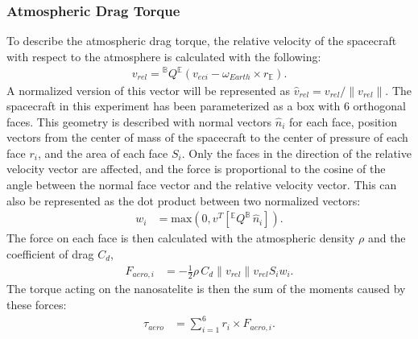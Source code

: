 \subsubsection{Atmospheric Drag Torque}
To describe the atmospheric drag torque, the relative velocity of the spacecraft with respect to the atmosphere is calculated with the following:
\begin{align}
    v_{rel} = {}^{\mathbb{B}} Q {}^{\mathbb{E}} ( v_{eci} - \omega_{Earth} \times r_{\mathbb{E}} ).
\end{align}
A normalized version of this vector will be represented as $\hat{v}_{rel} = v_{rel}/\|v_{rel}\|$.
The spacecraft in this experiment has been parameterized as a box with 6 orthogonal faces. This geometry is described with normal vectors $\hat{n}_i$ for each face, position vectors from the center of mass of the spacecraft to the center of pressure of each face $r_i$, and the area of each face $S_i$. Only the faces in the direction of the relative velocity vector are affected, and the force is proportional to the cosine of the angle between the normal face vector and the relative velocity vector. This can also be represented as the dot product between two normalized vectors:
\begin{align}
w_i &= \text{max}(0,v^T [^{\mathbb{E}}Q^{\mathbb{B}} \, \hat{n}_i]).
\end{align}
The force on each face is then calculated with the atmospheric density $\rho$ and the coefficient of drag $C_d$, 
\begin{align}
    F_{aero,i} &= -\frac{1}{2}\rho\, C_d \|v_{rel}\| v_{rel}S_i w_i.
\end{align}
The torque acting on the nanosatelite is then the sum of the moments caused by these forces:
\begin{align}
     \tau_{aero} &=  \sum_{i = 1}^6 r_i \times  F_{aero,i}.
\end{align}
